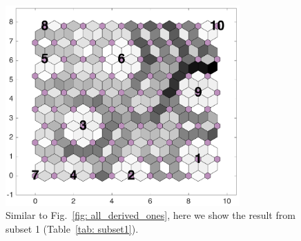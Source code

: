 \begin{figure}
        \centering
        \includegraphics[width=0.8\textwidth]{../../images0.01/M31/2D/image_subsets/subset1_dist_with_hits_t.png}
    \caption{Similar to Fig.~\ref{fig: all_derived_ones}, here we show the result from subset 1 (Table~\ref{tab: subset1}).}
    \label{fig: subset1}
\end{figure}